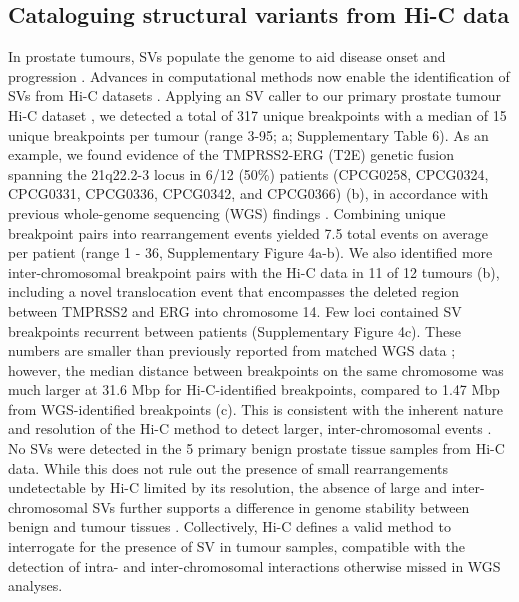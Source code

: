 \subsection{Cataloguing structural variants from Hi-C data}

In prostate tumours, SVs populate the genome to aid disease onset and progression \cite{fraserGenomicHallmarksLocalized2017,quigleyGenomicHallmarksStructural2018}.
Advances in computational methods now enable the identification of SVs from Hi-C datasets \cite{dixonIntegrativeDetectionAnalysis2018,hoStructuralVariationSequencing2019}.
Applying an SV caller to our primary prostate tumour Hi-C dataset \cite{dixonIntegrativeDetectionAnalysis2018}, we detected a total of 317 unique breakpoints with a median of 15 unique breakpoints per tumour (range 3-95; a; Supplementary Table 6).
As an example, we found evidence of the TMPRSS2-ERG (T2E) genetic fusion spanning the 21q22.2-3 locus in 6/12 (50\%) patients (CPCG0258, CPCG0324, CPCG0331, CPCG0336, CPCG0342, and CPCG0366) (b), in accordance with previous whole-genome sequencing (WGS) findings \cite{fraserGenomicHallmarksLocalized2017}.
Combining unique breakpoint pairs into rearrangement events yielded 7.5 total events on average per patient (range 1 - 36, Supplementary Figure 4a-b).
We also identified more inter-chromosomal breakpoint pairs with the Hi-C data in 11 of 12 tumours (b), including a novel translocation event that encompasses the deleted region between TMPRSS2 and ERG into chromosome 14.
Few loci contained SV breakpoints recurrent between patients (Supplementary Figure 4c).
These numbers are smaller than previously reported from matched WGS data \cite{fraserGenomicHallmarksLocalized2017}; however, the median distance between breakpoints on the same chromosome was much larger at 31.6 Mbp for Hi-C-identified breakpoints, compared to 1.47 Mbp from WGS-identified breakpoints (c).
This is consistent with the inherent nature and resolution of the Hi-C method to detect larger, inter-chromosomal events \cite{dixonIntegrativeDetectionAnalysis2018}.
No SVs were detected in the 5 primary benign prostate tissue samples from Hi-C data.
While this does not rule out the presence of small rearrangements undetectable by Hi-C limited by its resolution, the absence of large and inter-chromosomal SVs further supports a difference in genome stability between benign and tumour tissues \cite{fraserGenomicHallmarksLocalized2017,bergerGenomicComplexityPrimary2011,bacaPunctuatedEvolutionProstate2013,mazrooeiCistromePartitioningReveals2019}.
Collectively, Hi-C defines a valid method to interrogate for the presence of SV in tumour samples, compatible with the detection of intra- and inter-chromosomal interactions otherwise missed in WGS analyses.

